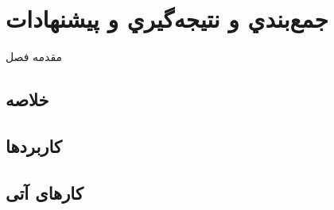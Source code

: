 \chapter{جمع‌بندي و نتيجه‌گيري و پیشنهادات}
مقدمه فصل

\section{خلاصه}
\section{کاربرد‌ها}
\section{کار‌های آتی}